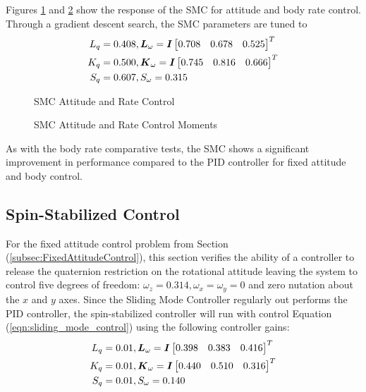 Figures \ref{fig:SMCAttitudeAndRateControl} and \ref{fig:SMCAttitudeAndRateControlMoments} show the response of the SMC for attitude and body rate control.  Through a gradient descent search, the SMC parameters are tuned to
\begin{equation}
  \begin{aligned}
    L_q &= 0.408, \boldsymbol{L}_{\omega} = \boldsymbol{I} \begin{bmatrix} 0.708 & 0.678 & 0.525 \end{bmatrix}^T \\
    K_q &= 0.500, \boldsymbol{K}_{\omega} = \boldsymbol{I} \begin{bmatrix} 0.745 & 0.816 & 0.666 \end{bmatrix}^T \\
    S_q &= 0.607, S_{\omega} = 0.315
  \end{aligned}
\end{equation}
\begin{figure}[H]
  \centerline{}
  \caption{SMC Attitude and Rate Control}
  \label{fig:SMCAttitudeAndRateControl}
\end{figure}
\begin{figure}[H]
  \centerline{}
  \caption{SMC Attitude and Rate Control Moments}
  \label{fig:SMCAttitudeAndRateControlMoments}
\end{figure}
As with the body rate comparative tests, the SMC shows a significant improvement in performance compared to the PID controller for fixed attitude and body control.

\subsection{Spin-Stabilized Control}
\label{subsec:SpinStabilizedControl}

For the fixed attitude control problem from Section (\ref{subsec:FixedAttitudeControl}), this section verifies the ability of a controller to release the quaternion restriction on the rotational attitude leaving the system to control five degrees of freedom: $\omega_z = 0.314, \omega_x = \omega_y = 0$ and zero nutation about the $x$ and $y$ axes.  Since the Sliding Mode Controller regularly out performs the PID controller, the spin-stabilized controller will run with control Equation (\ref{eqn:sliding_mode_control}) using the following controller gains:
\begin{equation}
  \begin{aligned}
    L_q &= 0.01, \boldsymbol{L}_{\omega} = \boldsymbol{I} \begin{bmatrix} 0.398 & 0.383 & 0.416 \end{bmatrix}^T \\
    K_q &= 0.01, \boldsymbol{K}_{\omega} = \boldsymbol{I} \begin{bmatrix} 0.440 & 0.510 & 0.316 \end{bmatrix}^T \\
    S_q &= 0.01, S_{\omega} = 0.140
  \end{aligned}
\end{equation}

